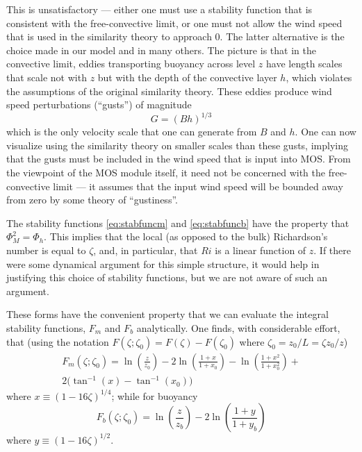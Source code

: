 \documentclass[12pt, letterpaper]{article}
\begin{document}
This is unsatisfactory --- either one must use a stability function
that is consistent with the free-convective limit, or one must not
allow the wind speed that is used in the similarity theory to approach
0.  The latter alternative is the choice made in our model and in many
others.  The picture is that in the convective limit, eddies
transporting buoyancy across level $z$ have length scales that scale
not with $z$ but with the depth of the convective layer $h$, which
violates the assumptions of the original similarity theory.  These
eddies produce wind speed perturbations (``gusts'') of magnitude
\begin{equation}
  G = (Bh)^{1/3}
\end{equation}
which is the only velocity scale that one can generate from $B$ and
$h$.  One can now visualize using the similarity theory on smaller
scales than these gusts, implying that the gusts must be included in
the wind speed that is input into MOS.  From the viewpoint of the MOS
module itself, it need not be concerned with the free-convective limit
--- it assumes that the input wind speed will be bounded away from
zero by some theory of ``gustiness''.

The stability functions \eqref{eq:stabfuncm} and \eqref{eq:stabfuncb}
have the property that $\Phi_M^2 = \Phi_h$.  This implies that the
local (as opposed to the bulk) Richardson's number is equal to
$\zeta$, and, in particular, that $Ri$ is a linear function of $z$.
If there were some dynamical argument for this simple structure, it
would help in justifying this choice of stability functions, but we
are not aware of such an argument.

These forms have the convenient property that we can evaluate the
integral stability functions, $F_m$ and $F_b$ analytically.  One
finds, with considerable effort, that (using the notation
$F(\zeta;\zeta_0) = F(\zeta) - F(\zeta_0)$ where $\zeta_0 = z_0/L =
\zeta z_0/z$)
\begin{multline}
  F_m(\zeta;\zeta_0) =
  \ln\left(\frac{z}{z_0}\right) - 2\ln\left(\frac{1+x}{1+x_0}\right) - \ln\left(\frac{1+x^2}{1+x_0^2}\right) + \\
  2\big(\tan^{-1}(x)-\tan^{-1}(x_0)\big)
\end{multline}
where $x \equiv (1-16\zeta)^{1/4}$; while for buoyancy
\begin{equation}
  F_b(\zeta;\zeta_0) = \ln\left(\frac{z}{z_b}\right)-2\ln\left(\frac{1+y}{1+y_b}\right)
\end{equation}
where $y \equiv (1-16\zeta)^{1/2}$.
\end{document}
